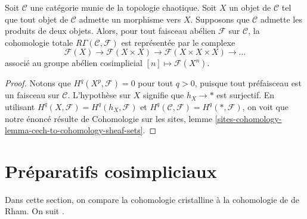 \begin{lemma}
\label{lemma-category-with-covering}
Soit $\mathcal{C}$ une catégorie munie de la topologie chaotique.
Soit $X$ un objet de $\mathcal{C}$ tel que tout objet de
$\mathcal{C}$ admette un morphisme vers $X$. Supposons que $\mathcal{C}$
admette les produits de deux objets.
Alors, pour tout faisceau abélien $\mathcal{F}$ sur $\mathcal{C}$,
la cohomologie totale $R\Gamma(\mathcal{C}, \mathcal{F})$ est représentée
par le complexe
$$
\mathcal{F}(X) \to \mathcal{F}(X \times X) \to
\mathcal{F}(X \times X \times X) \to \ldots
$$
associé au groupe abélien cosimplicial $[n] \mapsto \mathcal{F}(X^n)$.
\end{lemma}

\begin{proof}
Notons que $H^q(X^p, \mathcal{F}) = 0$ pour tout $q > 0$, puisque tout préfaisceau est un
faisceau sur $\mathcal{C}$. L'hypothèse sur $X$ signifie que $h_X \to *$
est surjectif. En utilisant $H^q(X, \mathcal{F}) = H^q(h_X, \mathcal{F})$ et
$H^q(\mathcal{C}, \mathcal{F}) = H^q(*, \mathcal{F})$, on voit que notre
énoncé résulte de
Cohomologie sur les sites,
lemme \ref{sites-cohomology-lemma-cech-to-cohomology-sheaf-sets}.
\end{proof}









\section{Préparatifs cosimpliciaux}
\label{section-cohomology}

\noindent
Dans cette section, on compare la cohomologie cristalline à la cohomologie
de de Rham. On suit \cite{Bhatt}.

